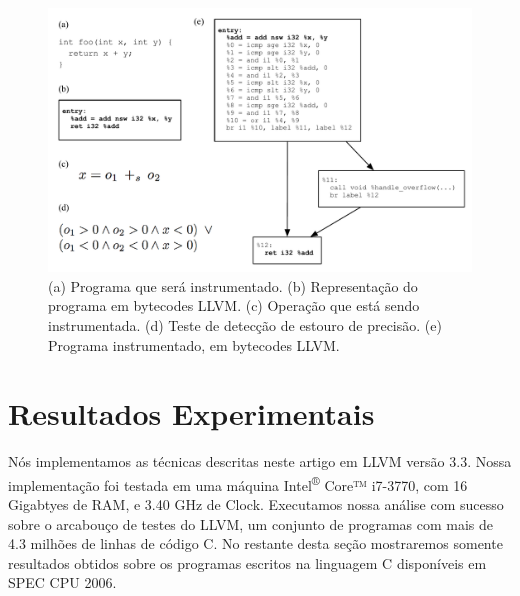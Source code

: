 \documentclass{llncs}
\begin{document}
\begin{figure}[t!]
\begin{center}
\includegraphics[width=1\textwidth]{images/instrumented_cfg}
\caption{(a) Programa que será instrumentado.
(b) Representação do programa em bytecodes LLVM.
(c) Operação que está sendo instrumentada.
(d) Teste de detecção de estouro de precisão.
(e) Programa instrumentado, em bytecodes LLVM.}
\label{fig:instrumented_cfg}
\end{center}
\end{figure}


\section{Resultados Experimentais}
\label{sec:exp}

Nós implementamos as técnicas descritas neste artigo em LLVM versão 3.3.
Nossa implementação foi testada em uma máquina Intel\textsuperscript{®} Core™ i7-3770, com 16 Gigabtyes de
RAM, e 3.40 GHz de Clock.
Executamos nossa análise com sucesso sobre o arcabouço de testes do LLVM,
um conjunto de programas com mais de 4.3 milhões de linhas de código C.
No restante desta seção mostraremos somente resultados obtidos sobre os
programas escritos na linguagem C disponíveis em SPEC CPU 2006.
\end{document}

